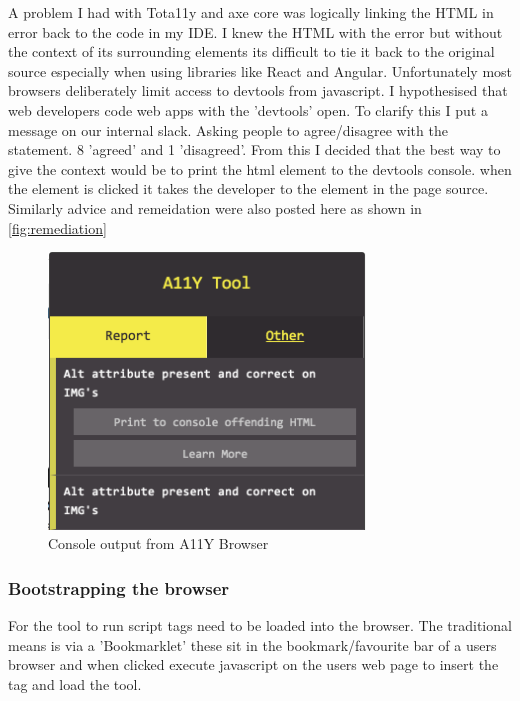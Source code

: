 A problem I had with Tota11y and axe core was logically linking the HTML in
error back to the code in my IDE. I knew the HTML with the error but
without the context of its surrounding elements its difficult to tie it back
to the original source especially when using libraries like React and Angular.
Unfortunately most browsers deliberately limit access to devtools from
javascript. I hypothesised that web developers code web apps with the
'devtools' open. To clarify this I put a message on our internal slack.
Asking people to agree/disagree with the statement. 8 'agreed' and 1 'disagreed'.
From this I decided that the best way to give the context would be to print
the html element to the devtools console. when the element is clicked it takes
the developer to the element in the page source. Similarly advice and
remeidation were also posted here as shown in \ref{fig:remediation}

\begin{figure}[H]
\centering
\includegraphics[width=0.75\textwidth]{figures/a11y_tool_remediation}
\captionsetup{justification=centering}
\caption{Console output from A11Y Browser
\label{fig:a11y_tool_remediation}}
\end{figure}

\subsubsection{Bootstrapping the browser}
For the tool to run script tags need to be loaded into the browser. The traditional means is via a
'Bookmarklet' these sit in the bookmark/favourite bar of a users
browser and when clicked execute javascript on the users web page to insert the
 tag and load the tool.

